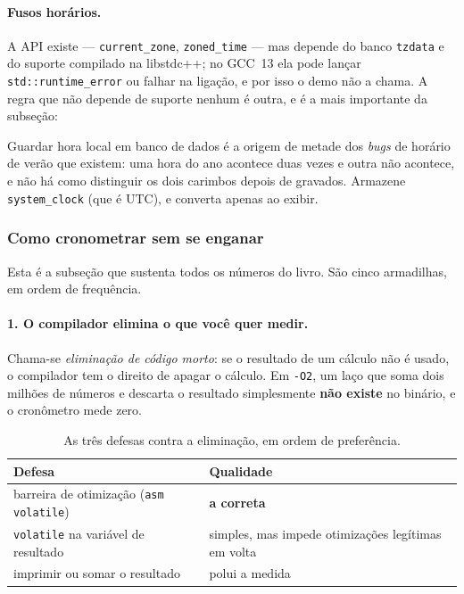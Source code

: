 \paragraph{Fusos horários.} A API existe --- \texttt{current\_zone},
\texttt{zoned\_time} --- mas depende do banco \texttt{tzdata} e do suporte
compilado na libstdc++; no GCC~13 ela pode lançar \texttt{std::runtime\_error}
ou falhar na ligação, e por isso o demo não a chama. A regra que não depende de
suporte nenhum é outra, e é a mais importante da subseção:

\begin{regra}
Guardar hora local em banco de dados é a origem de metade dos \emph{bugs} de
horário de verão que existem: uma hora do ano acontece duas vezes e outra não
acontece, e não há como distinguir os dois carimbos depois de gravados.
Armazene \texttt{system\_clock} (que é UTC), e converta apenas ao exibir.
\end{regra}

\subsubsection{Como cronometrar sem se enganar}
\label{sec:medicao}

Esta é a subseção que sustenta todos os números do livro. São cinco armadilhas,
em ordem de frequência.

\paragraph{1. O compilador elimina o que você quer medir.} Chama-se
\emph{eliminação de código morto}: se o resultado de um cálculo não é usado, o
compilador tem o direito de apagar o cálculo. Em \texttt{-O2}, um laço que soma
dois milhões de números e descarta o resultado simplesmente \textbf{não existe}
no binário, e o cronômetro mede zero.

\begin{table}[htbp]
\centering
\caption{As três defesas contra a eliminação, em ordem de preferência.}
\label{tab:defesas-dce}
\footnotesize
\begin{tabular}{@{}ll@{}}
\toprule
\textbf{Defesa} & \textbf{Qualidade} \\
\midrule
barreira de otimização (\texttt{asm volatile}) & \textbf{a correta} \\
\texttt{volatile} na variável de resultado     & simples, mas impede otimizações legítimas em volta \\
imprimir ou somar o resultado                  & polui a medida \\
\bottomrule
\end{tabular}
\end{table}

